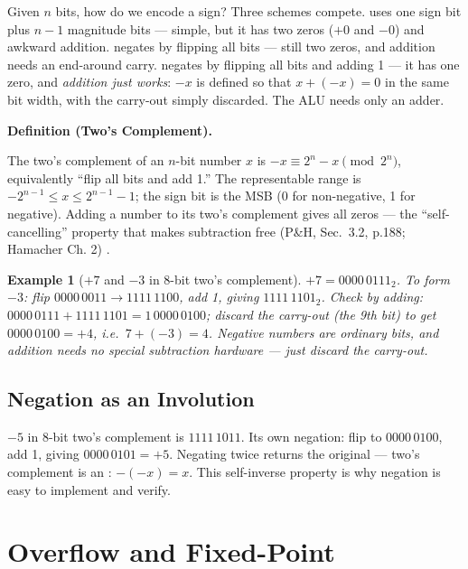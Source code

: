 \documentclass[11pt]{article}
\newtheorem{example}{Example}[section]
\newenvironment{definitionbox}[1]{%
  \par\noindent\textbf{Definition (#1).}\ \itshape
}{\par\vspace{0.3em}}
\begin{document}
Given $n$ bits, how do we encode a sign? Three schemes compete.  uses one sign bit plus $n-1$ magnitude bits --- simple, but it has two zeros ($+0$ and $-0$) and awkward addition.  negates by flipping all bits --- still two zeros, and addition needs an end-around carry.  negates by flipping all bits and adding 1 --- it has one zero, and \emph{addition just works}: $-x$ is defined so that $x + (-x) = 0$ in the same bit width, with the carry-out simply discarded. The ALU needs only an adder.

\begin{definitionbox}{Two's Complement}
The two's complement of an $n$-bit number $x$ is $-x \equiv 2^n - x \pmod{2^n}$, equivalently ``flip all bits and add 1.'' The representable range is $-2^{n-1} \le x \le 2^{n-1}-1$; the sign bit is the MSB (0 for non-negative, 1 for negative). Adding a number to its two's complement gives all zeros --- the ``self-cancelling'' property that makes subtraction free (P\&H, Sec.~3.2, p.188; Hamacher Ch. 2) \cite{PattersonHennessy2017_computer_organization_design,Hamacher2002_computer_organization}.
\end{definitionbox}

\begin{example}[$+7$ and $-3$ in 8-bit two's complement]
$+7 = 0000\,0111_2$. To form $-3$: flip $0000\,0011 \to 1111\,1100$, add 1, giving $1111\,1101_2$. Check by adding: $0000\,0111 + 1111\,1101 = 1\,0000\,0100$; discard the carry-out (the 9th bit) to get $0000\,0100 = +4$, i.e.\ $7 + (-3) = 4$. Negative numbers are ordinary bits, and addition needs no special subtraction hardware --- just discard the carry-out.
\end{example}

\subsection{Negation as an Involution}

$-5$ in 8-bit two's complement is $1111\,1011$. Its own negation: flip to $0000\,0100$, add 1, giving $0000\,0101 = +5$. Negating twice returns the original --- two's complement is an : $-(-x) = x$. This self-inverse property is why negation is easy to implement and verify.

\section{Overflow and Fixed-Point}
\label{sec:overflow-fixed}
\end{document}
